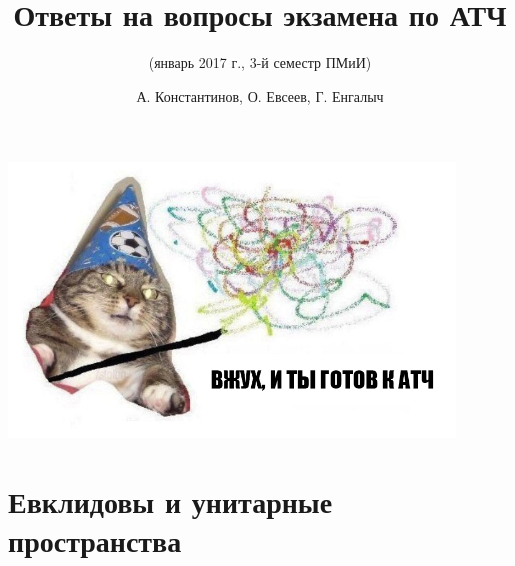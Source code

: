 \documentclass{scrartcl}
\title{Ответы на вопросы экзамена по АТЧ}
\subtitle{(январь 2017 г., 3-й семестр ПМиИ)}
\author{А. Константинов, О. Евсеев, Г. Енгалыч}
\begin{document}
    \thispagestyle{empty}
    \maketitle
    
    \begin{center}
        \vspace{120pt}
        \includegraphics[width=32em]{cat.png}
    \end{center}    

    \setcounter{part}{8}
    
    \part{Евклидовы и унитарные пространства}
    
    \setcounter{section}{13}
    
\end{document}
